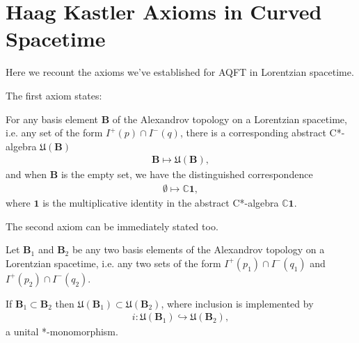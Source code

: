 \section{Haag Kastler Axioms in Curved Spacetime}\label{sctn:haag-kastler-axioms-in-curved-spacetime}
Here we recount the axioms we've established for AQFT in Lorentzian spacetime.

The first axiom states:

\begin{definition}
    \label{def:local-algebras-in-curved-spacetime}
    \leanok
    For any basis element $\mathbf{B}$ of the Alexandrov topology on a Lorentzian spacetime, i.e. any set of the form $I^+(p) \cap I^-(q)$, there is a corresponding abstract C*-algebra $\mathfrak{U}(\mathbf{B})$
    \begin{align}
        \mathbf{B} \longmapsto \mathfrak{U}(\mathbf{B}),
    \end{align}
    and when $\mathbf{B}$ is the empty set, we have the distinguished correspondence
    \begin{align}
        \emptyset \longmapsto \mathbb{C} \mathbf{1},
    \end{align}
    where $\mathbf{1}$ is the multiplicative identity in the abstract C*-algebra $\mathbb{C} \mathbf{1}$.
\end{definition}

The second axiom can be immediately stated too.

\begin{definition}
    \label{def:isotony-in-curved-spacetime}
    \leanok
    Let $\mathbf{B}_1$ and $\mathbf{B}_2$ be any two basis elements of the Alexandrov topology on a Lorentzian spacetime, i.e. any two sets of the form $I^+(p_1) \cap I^-(q_1)$ and $I^+(p_2) \cap I^-(q_2)$.
    
    If $\mathbf{B}_1 \subset \mathbf{B}_2$ then $\mathfrak{U}(\mathbf{B}_1) \subset \mathfrak{U}(\mathbf{B}_2)$, where inclusion is implemented by
    \begin{align}
        i : \mathfrak{U}(\mathbf{B}_1) \hookrightarrow \mathfrak{U}(\mathbf{B}_2),
    \end{align}
    a unital *-monomorphism.
\end{definition}

